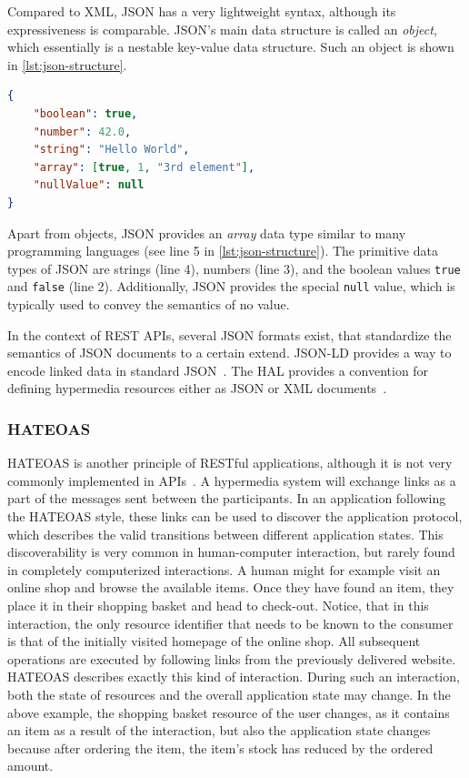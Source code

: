 Compared to \ac{XML}, \ac{JSON} has a very lightweight syntax, although its expressiveness is comparable.
\ac{JSON}'s main data structure is called an \textit{object}, which essentially is a nestable key-value data structure.
Such an object is shown in \autoref{lst:json-structure}.

\begin{lstlisting}[caption={\acs{JSON} Data Types and Structures}, label=lst:json-structure, language=json]
{
    "boolean": true,
    "number": 42.0,
    "string": "Hello World",
    "array": [true, 1, "3rd element"],
    "nullValue": null
}
\end{lstlisting}

Apart from objects, \ac{JSON} provides an \textit{array} data type similar to many programming languages (see line 5 in \autoref{lst:json-structure}).
The primitive data types of \ac{JSON} are strings (line 4), numbers (line 3), and the boolean values \texttt{true} and \texttt{false} (line 2).
Additionally, \ac{JSON} provides the special \texttt{null} value, which is typically used to convey the semantics of no value.

In the context of \ac{REST} \acp{API}, several \ac{JSON} formats exist, that standardize the semantics of \ac{JSON} documents to a certain extend.
JSON-LD provides a way to encode linked data in standard \ac{JSON}~\cite{Kellogg2020}.
The \ac{HAL} provides a convention for defining hypermedia resources either as \ac{JSON} or \ac{XML} documents~\cite{HALdraft}.

\subsubsection{\acf{HATEOAS}}

\ac{HATEOAS} is another principle of \ac{REST}ful applications, although it is not very commonly implemented in \acp{API}~\cite{Liskin2011,Webber2010,Adamczyk2011}.
A hypermedia system will exchange links as a part of the messages sent between the participants.
In an application following the \ac{HATEOAS} style, these links can be used to discover the application protocol, which describes the valid transitions between different application states.
This discoverability is very common in human-computer interaction, but rarely found in completely computerized interactions.
A human might for example visit an online shop and browse the available items.
Once they have found an item, they place it in their shopping basket and head to check-out.
Notice, that in this interaction, the only resource identifier that needs to be known to the consumer is that of the initially visited homepage of the online shop.
All subsequent operations are executed by following links from the previously delivered website.
\ac{HATEOAS} describes exactly this kind of interaction.
During such an interaction, both the state of resources and the overall application state may change.
In the above example, the shopping basket resource of the user changes, as it contains an item as a result of the interaction, but also the application state changes because after ordering the item, the item's stock has reduced by the ordered amount.

